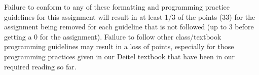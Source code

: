 \documentclass[11pt]{article}
\begin{document}
Failure to conform to any of these formatting and programming practice
guidelines for this assignment will result in at least 1/3 of the
points (33) for the assignment being removed for each guideline that
is not followed (up to 3 before getting a 0 for the
assignment). Failure to follow other class/textbook programming
guidelines may result in a loss of points, especially for those
programming practices given in our Deitel textbook that have been in
our required reading so far.
\end{document}

